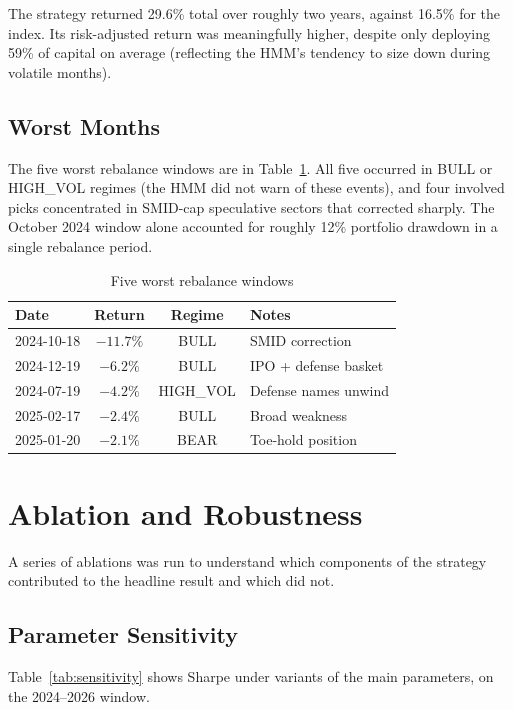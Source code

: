 \documentclass[conference]{IEEEtran}
\begin{document}
The strategy returned 29.6\% total over roughly two years, against 16.5\% for the index. Its risk-adjusted return was meaningfully higher, despite only deploying 59\% of capital on average (reflecting the HMM's tendency to size down during volatile months).

\subsection{Worst Months}

The five worst rebalance windows are in Table~\ref{tab:worst}. All five occurred in BULL or HIGH\_VOL regimes (the HMM did not warn of these events), and four involved picks concentrated in SMID-cap speculative sectors that corrected sharply. The October 2024 window alone accounted for roughly 12\% portfolio drawdown in a single rebalance period.

\begin{table}[htbp]
\caption{Five worst rebalance windows}
\label{tab:worst}
\centering
\footnotesize
\begin{tabular}{lccl}
\toprule
\textbf{Date} & \textbf{Return} & \textbf{Regime} & \textbf{Notes} \\
\midrule
2024-10-18 & $-11.7\%$ & BULL & SMID correction \\
2024-12-19 & $-6.2\%$  & BULL & IPO + defense basket \\
2024-07-19 & $-4.2\%$  & HIGH\_VOL & Defense names unwind \\
2025-02-17 & $-2.4\%$  & BULL & Broad weakness \\
2025-01-20 & $-2.1\%$  & BEAR & Toe-hold position \\
\bottomrule
\end{tabular}
\end{table}

\section{Ablation and Robustness}

A series of ablations was run to understand which components of the strategy contributed to the headline result and which did not.

\subsection{Parameter Sensitivity}

Table~\ref{tab:sensitivity} shows Sharpe under variants of the main parameters, on the 2024--2026 window.
\end{document}
